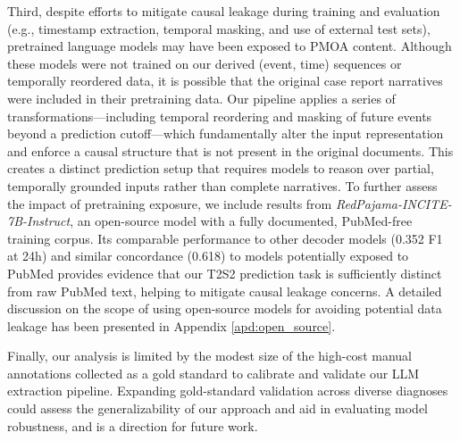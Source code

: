 Third, despite efforts to mitigate causal leakage during training and evaluation (e.g., timestamp extraction, temporal masking, and use of external test sets), pretrained language models may have been exposed to PMOA content. Although these models were not trained on our derived (event, time) sequences or temporally reordered data, it is possible that the original case report narratives were included in their pretraining data. Our pipeline applies a series of transformations—including temporal reordering and masking of future events beyond a prediction cutoff—which fundamentally alter the input representation and enforce a causal structure that is not present in the original documents. This creates a distinct prediction setup that requires models to reason over partial, temporally grounded inputs rather than complete narratives. To further assess the impact of pretraining exposure, we include results from \textit{RedPajama-INCITE-7B-Instruct}, an open-source model with a fully documented, PubMed-free training corpus. Its comparable performance to other decoder models (0.352 F1 at 24h) and similar concordance (0.618) to models potentially exposed to PubMed provides evidence that our T2S2 prediction task is sufficiently distinct from raw PubMed text, helping to mitigate causal leakage concerns. A detailed discussion on the scope of using open-source models for avoiding potential data leakage has been presented in Appendix \ref{apd:open_source}.

Finally, our analysis is limited by the modest size of the high-cost manual annotations collected as a gold standard to calibrate and validate our LLM extraction pipeline. Expanding gold-standard validation across diverse diagnoses could assess the generalizability of our approach and aid in evaluating model robustness, and is a direction for future work.